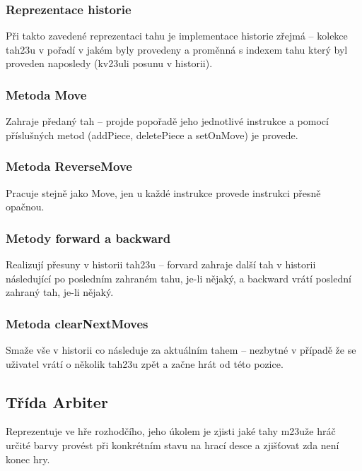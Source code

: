\documentclass{article}
\begin{document}
\subsubsection{Reprezentace historie}
P\v{r}i takto zaveden\'e reprezentaci tahu je implementace historie z\v{r}ejm\'a – kolekce tah\accent23u v po\v{r}ad\'i v jak\'em byly provedeny a prom\v{e}nn\'a s indexem tahu kter\'y byl proveden naposledy (kv\accent23uli posunu v historii).

\subsubsection{Metoda Move}
Zahraje p\v{r}edan\'y tah – projde popo\v{r}ad\v{e} jeho jednotliv\'e instrukce a pomoc\'i p\v{r}\'islu\v{s}n\'ych metod (addPiece, deletePiece a setOnMove) je provede.

\subsubsection{Metoda ReverseMove}
Pracuje stejn\v{e} jako Move, jen u ka\v{z}d\'e instrukce provede instrukci p\v{r}esn\v{e} opa\v{c}nou.

\subsubsection{Metody forward a backward}
Realizuj\'i p\v{r}esuny v historii tah\accent23u – forvard zahraje dal\v{s}\'i tah v historii n\'asleduj\'ic\'i po posledn\'im zahran\'em tahu, je-li n\v{e}jak\'y, a backward vr\'at\'i posledn\'i zahran\'y tah, je-li n\v{e}jak\'y.

\subsubsection{Metoda clearNextMoves}
Sma\v{z}e v\v{s}e v historii co n\'asleduje za aktu\'aln\'im tahem – nezbytn\'e v p\v{r}\'ipad\v{e} \v{z}e se u\v{z}ivatel vr\'at\'i o n\v{e}kolik tah\accent23u zp\v{e}t a za\v{c}ne hr\'at od t\'eto pozice.



\subsection{T\v{r}\'ida Arbiter}
Reprezentuje ve h\v{r}e rozhod\v{c}\'iho, jeho \'ukolem je zjisti jak\'e tahy m\accent23u\v{z}e hr\'a\v{c} ur\v{c}it\'e barvy prov\'est p\v{r}i konkr\'etn\'im stavu na hrac\'i desce a zji\v{s}\v{t}ovat zda nen\'i konec hry.
\end{document}
